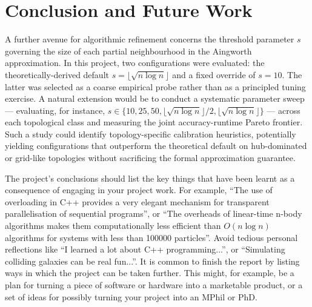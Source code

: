 \chapter{Conclusion and Future Work}
A further avenue for algorithmic refinement concerns the threshold parameter $s$ governing the size of each partial neighbourhood in the Aingworth approximation. In this project, two configurations were evaluated: the theoretically-derived default $s = \lfloor\sqrt{n \log n}\rfloor$ and a fixed override of $s = 10$. The latter was selected as a coarse empirical probe rather than as a principled tuning exercise. A natural extension would be to conduct a systematic parameter sweep --- evaluating, for instance, $s \in \{10, 25, 50, \lfloor\sqrt{n \log n}\rfloor / 2, \lfloor\sqrt{n \log n}\rfloor\}$ --- across each topological class and measuring the joint accuracy-runtime Pareto frontier. Such a study could identify topology-specific calibration heuristics, potentially yielding configurations that outperform the theoretical default on hub-dominated or grid-like topologies without sacrificing the formal approximation guarantee.


The project's conclusions should list the key things that have been learnt as a consequence of engaging in your project work. For example, ``The use of overloading in C++ provides a very elegant mechanism for transparent parallelisation of sequential programs'', or ``The overheads of linear-time n-body algorithms makes them computationally less efficient than $O(n \log n)$ algorithms for systems with less than 100000 particles''. Avoid tedious personal reflections like ``I learned a lot about C++ programming...'', or ``Simulating colliding galaxies can be real fun...''. It is common to finish the report by listing ways in which the project can be taken further. This might, for example, be a plan for turning a piece of software or hardware into a marketable product, or a set of ideas for possibly turning your project into an MPhil or PhD.